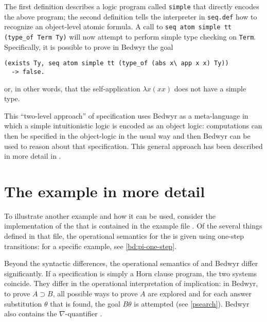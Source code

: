 The first definition describes a logic program called \lstinline{simple}
that directly encodes the above \lp{} program; the second definition
tells the interpreter in \lstinline{seq.def} how to recognize an
object-level atomic formula.  A call to
\lstinline{seq atom simple tt (type_of Term Ty)} will now attempt to
perform simple type checking on \lstinline{Term}.  Specifically, it is
possible to prove in Bedwyr the goal
\begin{center}\begin{lstlisting}
(exists Ty, seq atom simple tt (type_of (abs x\ app x x) Ty))
  -> false.
\end{lstlisting}\end{center}
or, in other words, that the self-application $\lambda x(x x)$ does not
have a simple type.

This ``two-level approach'' of specification uses Bedwyr as a
meta-language in which a simple intuitionistic logic is encoded as an
object logic: computations can then be specified in the object-logic in
the usual way and then Bedwyr can be used to reason about that
specification.  This general approach has been described in more detail
in \cite{miller06ijcar,gacek.twolevel}.


\section{The \texorpdfstring{\pc{}}{pi-calculus} example in more detail}
\label{pi-examples}

To illustrate another example and how it can be used, consider the
implementation of the \pc{} that is contained in the example file
.  Of the several things defined in that file, the
operational semantics for the \pc{} is given using one-step transitions:
for a specific example, see \autoref{bd:pi-one-step}.

Beyond the syntactic differences, the operational semantics of \lp{} and
Bedwyr differ significantly.  If a specification is simply a Horn clause
program, the two systems coincide.  They differ in the operational
interpretation of implication: in Bedwyr, to prove $A\supset B$, all
possible ways to prove $A$ are explored and for each answer substitution
$\theta$ that is found, the goal $B\theta$ is attempted (see
\autoref{psearch}).  Bedwyr also contains the $\nabla$-quantifier
\cite{miller05tocl}.

